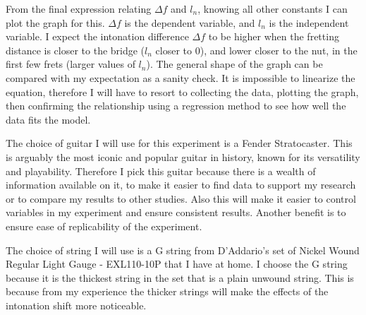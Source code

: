 From the final expression relating $\Delta f$ and $l_n$, knowing all other constants I can plot the graph for this. $\Delta f$ is the dependent variable, and $l_n$ is the independent variable. I expect the intonation difference $\Delta f$ to be higher when the fretting distance is closer to the bridge ($l_n$ closer to 0), and lower closer to the nut, in the first few frets (larger values of $l_n$). The general shape of the graph can be compared with my expectation as a sanity check. It is impossible to linearize the equation, therefore I will have to resort to collecting the data, plotting the graph, then confirming the relationship using a regression method to see how well the data fits the model. \par
The choice of guitar I will use for this experiment is a Fender Stratocaster. This is arguably the most iconic and popular guitar in history, known for its versatility and playability. Therefore I pick this guitar because there is a wealth of information available on it, to make it easier to find data to support my research or to compare my results to other studies. Also this will make it easier to control variables in my experiment and ensure consistent results. Another benefit is to ensure ease of replicability of the experiment. \par
The choice of string I will use is a G string from D'Addario's set of Nickel Wound Regular Light Gauge - EXL110-10P that I have at home. I choose the G string because it is the thickest string in the set that is a plain unwound string. This is because from my experience the thicker strings will make the effects of the intonation shift more noticeable. 